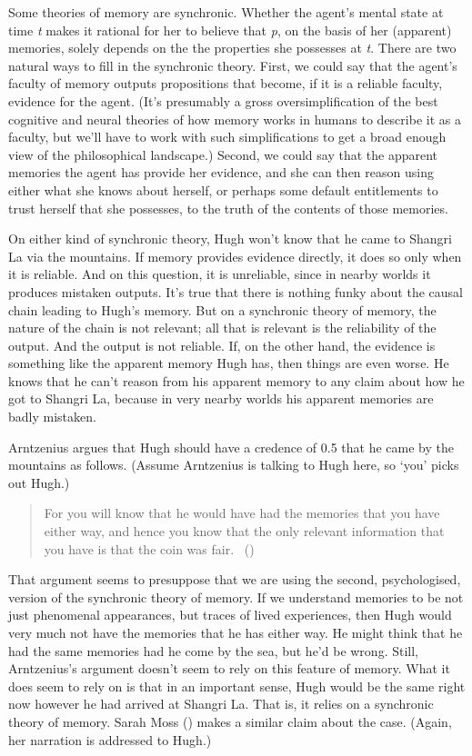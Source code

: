 \documentclass[
  10pt,
  letterpaper,
  twoside]{scrbook}
\begin{document}
Some theories of memory are synchronic. Whether the agent's mental state
at time \emph{t} makes it rational for her to believe that \emph{p}, on
the basis of her (apparent) memories, solely depends on the the
properties she possesses at \emph{t}. There are two natural ways to fill
in the synchronic theory. First, we could say that the agent's faculty
of memory outputs propositions that become, if it is a reliable faculty,
evidence for the agent. (It's presumably a gross oversimplification of
the best cognitive and neural theories of how memory works in humans to
describe it as a faculty, but we'll have to work with such
simplifications to get a broad enough view of the philosophical
landscape.) Second, we could say that the apparent memories the agent
has provide her evidence, and she can then reason using either what she
knows about herself, or perhaps some default entitlements to trust
herself that she possesses, to the truth of the contents of those
memories.

On either kind of synchronic theory, {Hugh} won't know that he came to
Shangri La via the mountains. If memory provides evidence directly, it
does so only when it is reliable. And on this question, it is
unreliable, since in nearby worlds it produces mistaken outputs. It's
true that there is nothing funky about the causal chain leading to
{Hugh}'s memory. But on a synchronic theory of memory, the nature of the
chain is not relevant; all that is relevant is the reliability of the
output. And the output is not reliable. If, on the other hand, the
evidence is something like the apparent memory {Hugh} has, then things
are even worse. He knows that he can't reason from his apparent memory
to any claim about how he got to Shangri La, because in very nearby
worlds his apparent memories are badly mistaken.

Arntzenius argues that {Hugh} should have a credence of 0.5 that he came
by the mountains as follows. (Assume Arntzenius is talking to Hugh here,
so `you' picks out Hugh.)

\begin{quote}
For you will know that he would have had the memories that you have
either way, and hence you know that the only relevant information that
you have is that the coin was fair.
~()
\end{quote}

That argument seems to presuppose that we are using the second,
psychologised, version of the synchronic theory of memory. If we
understand memories to be not just phenomenal appearances, but traces of
lived experiences, then {Hugh} would very much not have the memories
that he has either way. He might think that he had the same memories had
he come by the sea, but he'd be wrong. Still, Arntzenius's argument
doesn't seem to rely on this feature of memory. What it does seem to
rely on is that in an important sense, {Hugh} would be the same right
now however he had arrived at Shangri La. That is, it relies on a
synchronic theory of memory. Sarah Moss ()
makes a similar claim about the case. (Again, her narration is addressed
to Hugh.)
\end{document}
